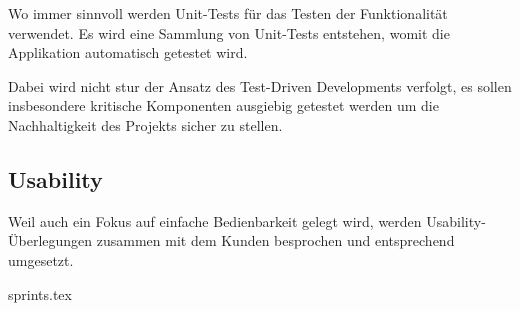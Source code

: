 Wo immer sinnvoll werden Unit-Tests für das Testen der Funktionalität verwendet. Es wird eine Sammlung von Unit-Tests entstehen, womit die Applikation automatisch getestet wird.

Dabei wird nicht stur der Ansatz des Test-Driven Developments verfolgt, es sollen insbesondere kritische Komponenten ausgiebig getestet werden um die Nachhaltigkeit des Projekts sicher zu stellen.

\subsection*{Usability}

Weil auch ein Fokus auf einfache Bedienbarkeit gelegt wird, werden Usability-Überlegungen zusammen mit dem Kunden besprochen und entsprechend umgesetzt.

\xxx

{sprints.tex}
